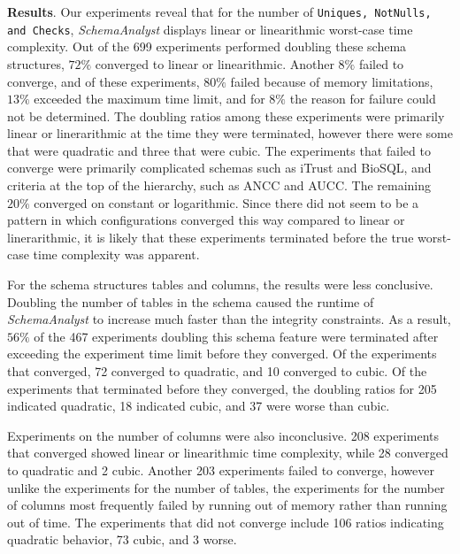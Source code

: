 \textbf{Results}. Our experiments reveal that for the number of \texttt{Uniques, NotNulls, and Checks},
\textit{SchemaAnalyst} displays linear or linearithmic worst-case time complexity.  Out of the 699 experiments
performed doubling these schema structures, $72\%$ converged to linear or linearithmic.  Another $8\%$ failed to
converge, and of these experiments, $80\%$ failed because of memory limitations, $13\%$ exceeded the maximum time limit,
and for $8\%$ the reason for failure could not be determined.  The doubling ratios among these experiments were
primarily linear or linerarithmic at the time they were terminated, however there were some that were quadratic and
three that were cubic.  The experiments that failed to converge were primarily complicated schemas such as iTrust and
BioSQL, and criteria at the top of the hierarchy, such as ANCC and AUCC. The remaining $20\%$ converged on constant or
logarithmic.  Since there did not seem to be a pattern in which configurations converged this way compared to linear or
linerarithmic, it is likely that these experiments terminated before the true worst-case time complexity was apparent.

For the schema structures tables and columns, the results were less conclusive. Doubling the number of tables in the
schema caused the runtime of \textit{SchemaAnalyst} to increase much faster than the integrity constraints. As a result,
$56\%$ of the 467 experiments doubling this schema feature were terminated after exceeding the experiment time limit
before they converged.  Of the experiments that converged, 72 converged to quadratic, and 10 converged to cubic.  Of the
experiments that terminated before they converged, the doubling ratios for 205 indicated quadratic, 18 indicated cubic,
and 37 were worse than cubic.

Experiments on the number of columns were also inconclusive.  208 experiments that converged showed linear or
linearithmic time complexity, while 28 converged to quadratic and 2 cubic.  Another 203 experiments failed to converge,
however unlike the experiments for the number of tables, the experiments for the number of columns most frequently
failed by running out of memory rather than running out of time. The experiments that did not converge include 106
ratios indicating quadratic behavior, 73 cubic, and 3 worse.


